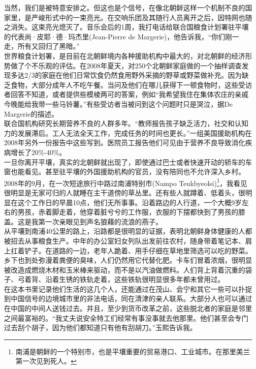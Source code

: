 \begin{multicols}{\theparacolNo}
当然，我们是被特意安排之。但这也是个信号，在像北朝鲜这样一个机制不良的国家里，是严峻形式中的一束亮光。在交响乐团及其随行人员离开之后，因特网也随之消失。这束亮光熄灭了。音乐会后的1周，我打电话给联合国粮食计划署驻平壤的代表尚·皮耶·德·玛杰里(Jean-Pierre de Margerie)，他告诉我，“你们刚一走，所有又回归了黑暗。”\\

世界粮食计划署，是目前在北朝鲜境内各种援助机构中最大的，对北朝鲜的经济形势做了个不乐观的评估。在2008年夏天，对250个北朝鲜家庭做的一个抽样调查发现多达2/3的家庭在他们日常饮食仍然食用野外采摘的野草或野菜做补充。因为缺乏食物，大部分成年人不吃午餐。当问及他们在哪儿获得下一顿食物时，这些受访者回答不知道，或者提供些模棱两可的答案，例如“我希望我住在集体农庄的亲戚今晚能给我带一些马铃薯。”有些受访者当被问到这个问题时只是哭泣，据De Margerie的描述。\\

联合国机构研究长期营养不良的人群多年。“教师报告孩子缺乏活力，社交和认知力的发展滞后。工人无法全天工作，完成任务的时间也更长。”一组美国援助机构在2008年另外一份报告中这些写到。医院员工报告他们可见由于营养不良导致消化疾病增长了20\%-40\%。\\

一旦你离开平壤，真实的北朝鲜就出现了，即使通过巴士或者快速开动的轿车的车窗也能看见。甚至驻平壤的外国援助机构的官员，没有陪同也不允许深入乡村。2008年的9月，在一次短途旅行中路过南浦特别市(Nampo Teukbyeolsi)\footnote{南浦是朝鲜的一个特别市，也是平壤重要的贸易港口、工业城市。在那里美兰第一次见到死人。}，我看见很明显是无家可归的人就睡在主干道傍的草丛里。还有些人就蹲着、低着头，很明显在这个工作日的早晨10点，他们无所事事。沿着路边的人行道，一个大概9岁左右的男孩，赤着脚走着，他穿着脏兮兮的工作服，衣服的下摆都快到了男孩的膝盖。这是我第一次亲眼见到声名狼藉的流浪的燕子。\\

从平壤到南浦40公里的路上，沿路都是很明显的证据，表明北朝鲜身体健康的人都被招去从事粮食生产。中年的办公室妇女列队出发前往农村，随身带着笔记本、肩上扛着铲子。在道路的一边，老年人跪着、用手仔细在草地里筛选可以吃的野菜。乡下也到处弥漫着粪便的臭味，人们仍然用它代替化肥。卡车们冒着浓烟，很明显被改造成燃烧木材和玉米棒来驱动，而不是以汽油做燃料。人们背上背着沉重的袋子、弓着背、沿着生锈的铁轨走着，这些铁轨很明显很多年都未曾用过。\\

在这本书里记录他们生活的这几个人，还能通过在茂山、会宁和其它一些可以扑捉到中国信号的边境城市里的非法电话，同在清津的亲人联系。大部分人也可以通过在中国的中间人送钱过去。并且，至少到货币改革之前，这些脱北者的家庭是邻里之间最富裕的。“我丈夫说安全特工们经常有事没事就去他那里。他们甚至会专门过去刮个胡子，因为他们都知道只有他有刮胡刀。”玉熙告诉我。\\


\end{multicols}
